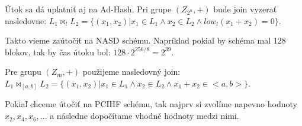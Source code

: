 Útok sa dá uplatniť aj na Ad-Hash.
Pri grupe $(Z_{2^n}, +)$ bude join vyzerať nasledovne: $L_1 \bowtie_l L_2 = \{(x_1, x_2) | x_1 \in L_1 \land x_2 \in L_2 \land low_l(x_1 + x_2) = 0\}$.

Takto vieme zaútočiť na NASD schému. Napríklad pokiaľ by schéma mal 128 blokov, tak by čas útoku bol: $128 \cdot 2^{256/8} = 2^{39}$.

Pre grupu $(Z_m, +)$ použijeme nasledovný join: $L_1 \bowtie_{[a,b]} L_2 = \{(x_1, x_2) | x_1 \in L_1 \land x_2 \in L_2 \land x_1 + x_2 \in <a,b>\}$.


Pokiaľ chceme útočiť na PCIHF schému, tak najprv si zvolíme napevno hodnoty $x_2, x_4, x_6, \dots$ a následne dopočítame vhodné hodnoty medzi nimi.

